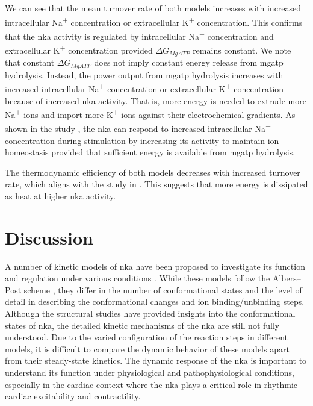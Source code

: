\documentclass{biophys-new}
\begin{document}
We can see that the mean turnover rate of both models increases with increased intracellular Na\textsuperscript{+} concentration or extracellular K\textsuperscript{+} concentration. This confirms that the \gls{nka} activity is regulated by intracellular Na\textsuperscript{+} concentration and extracellular K\textsuperscript{+} concentration \cite{despa_intracellular_2002,nelson_heart_2022} provided $\Delta G_{MgATP}$ remains constant. We note that constant $\Delta G_{MgATP}$ does not imply constant energy release from \gls{mgatp} hydrolysis. Instead, the power output from \gls{mgatp} hydrolysis increases with increased intracellular Na\textsuperscript{+} concentration or extracellular K\textsuperscript{+} concentration because of increased \gls{nka} activity. That is, more energy is needed to extrude more Na\textsuperscript{+} ions and import more K\textsuperscript{+} ions against their electrochemical gradients. As shown in the study \cite{nelson_heart_2022}, the \gls{nka} can respond to increased intracellular Na\textsuperscript{+} concentration during stimulation by increasing its activity to maintain ion homeostasis provided that sufficient energy is available from \gls{mgatp} hydrolysis.

The thermodynamic efficiency of both models decreases with increased turnover rate, which aligns with the study in \cite{wagoner_mechanisms_2019}. This suggests that more energy is dissipated as heat at higher \gls{nka} activity.

\section*{Discussion}

A number of kinetic models of \gls{nka} have been proposed to investigate its function and regulation under various conditions \cite{post_flexibility_1969,karlish_conformational_1978,glynn_na_1985, apell_electrogenic_1989,terkildsen_balance_2007,guerra_multistate_2025}. While these models follow the Albers–Post scheme \cite{albers_role_1963,post_activation_1972}, they differ in the number of conformational states and the level of detail in describing the conformational changes and ion binding/unbinding steps. Although the structural studies \cite{morth_crystal_2007,shinoda_crystal_2009,nyblom_crystal_2013,kanai_crystal_2013,kanai_binding_2021,nguyen_structural_2022,guo_cryo-em_2022} have provided insights into the conformational states of \gls{nka}, the detailed kinetic mechanisms of the \gls{nka} are still not fully understood. Due to the varied configuration of the reaction steps in different models, it is difficult to compare the dynamic behavior of these models apart from their steady-state kinetics. The dynamic response of the \gls{nka} is important to understand its function under physiological and pathophysiological conditions, especially in the cardiac context where the \gls{nka} plays a critical role in rhythmic cardiac excitability and contractility.
\end{document}
